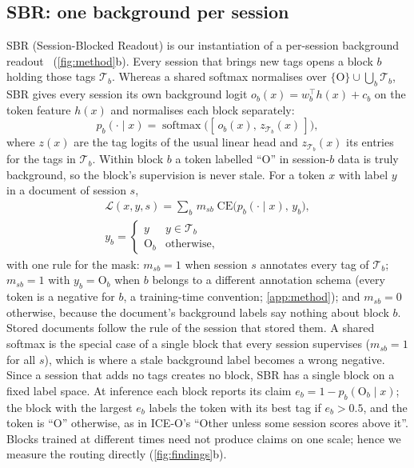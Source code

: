 \documentclass[10pt,twocolumn,letterpaper]{article}
\begin{document}
\subsection{SBR: one background per session}
\label{sec:sbr}
SBR (Session-Blocked Readout) is our instantiation of a per-session background readout~\citep{liu2023ice,kim2022more} (\cref{fig:method}b). Every session that brings new tags opens a block $b$ holding those tags $\mathcal{T}_b$. Whereas a shared softmax normalises over $\{\mathrm{O}\}\cup\bigcup_b\mathcal{T}_b$, SBR gives every session its own background logit $o_b(x)=w_b^{\top}h(x)+c_b$ on the token feature $h(x)$ and normalises each block separately:
\begin{equation}
p_b(\cdot\mid x)=\operatorname{softmax}\big([\,o_b(x),\,z_{\mathcal{T}_b}(x)\,]\big),
\label{eq:block}
\end{equation}
where $z(x)$ are the tag logits of the usual linear head and $z_{\mathcal{T}_b}(x)$ its entries for the tags in $\mathcal{T}_b$. Within block $b$ a token labelled ``O'' in session-$b$ data is truly background, so the block's supervision is never stale. For a token $x$ with label $y$ in a document of session $s$,
\begin{equation}
\begin{gathered}
\mathcal{L}(x,y,s)=\sum_{b}\,m_{sb}\;\mathrm{CE}\big(p_b(\cdot\mid x),\,y_b\big),\\
y_b=\begin{cases} y & y\in\mathcal{T}_b\\ \mathrm{O}_b & \text{otherwise,}\end{cases}
\end{gathered}
\label{eq:sbr}
\end{equation}
with one rule for the mask: $m_{sb}{=}1$ when session $s$ annotates every tag of $\mathcal{T}_b$; $m_{sb}{=}1$ with $y_b{=}\mathrm{O}_b$ when $b$ belongs to a different annotation schema (every token is a negative for $b$, a training-time convention; \cref{app:method}); and $m_{sb}{=}0$ otherwise, because the document's background labels say nothing about block $b$. Stored documents follow the rule of the session that stored them. A shared softmax is the special case of a single block that every session supervises ($m_{sb}{=}1$ for all $s$), which is where a stale background label becomes a wrong negative. Since a session that adds no tags creates no block, SBR has a single block on a fixed label space. At inference each block reports its claim $e_b=1-p_b(\mathrm{O}_b\mid x)$; the block with the largest $e_b$ labels the token with its best tag if $e_b>0.5$, and the token is ``O'' otherwise, as in ICE-O's ``Other unless some session scores above it''. Blocks trained at different times need not produce claims on one scale; hence we measure the routing directly (\cref{fig:findings}b).
\end{document}

